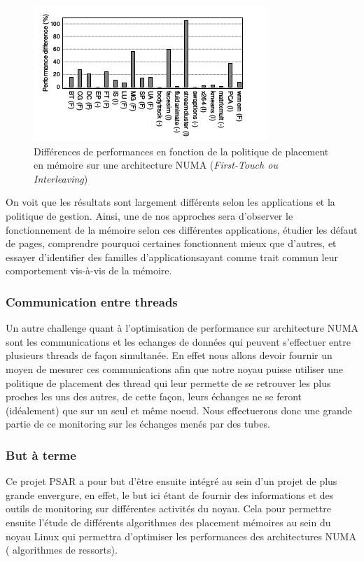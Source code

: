     \begin{figure}[H]
        \begin{center}
          \includegraphics[scale=0.65]{img/numa_memory_policy}
          \caption{Différences de performances en fonction de la politique de
            placement en mémoire sur une architecture NUMA (\textit{First-Touch ou Interleaving})}
        \end{center}
    \end{figure}

    On voit que les résultats sont largement différents selon les applications
    et la politique de gestion. Ainsi, une de nos approches sera d'observer le
    fonctionnement de la mémoire selon ces différentes applications, étudier les
    défaut de pages, comprendre pourquoi certaines fonctionnent mieux que
    d'autres, et essayer d'identifier des \og familles d'applications\fg ayant
    comme trait commun leur comportement vis-à-vis de la mémoire.
    
  \subsubsection{Communication entre threads}
    
    Un autre challenge quant à l'optimisation de performance sur architecture 
    NUMA sont les communications et les echanges de données qui peuvent s'effectuer entre 
    plusieurs threads de façon simultanée. En effet nous allons devoir fournir un moyen
    de mesurer ces communications afin que notre noyau 
    puisse utiliser une politique de placement des thread qui leur permette de 
    se retrouver les plus proches les uns des autres, de cette façon, leurs échanges 
    ne se feront (idéalement) que sur un seul et même noeud. Nous effectuerons donc
    une grande partie de ce monitoring sur les échanges menés par des tubes.

  \subsubsection{But à terme}

    Ce projet PSAR a pour but d'être ensuite intégré au sein d'un projet de plus grande 
    envergure, en effet, le but ici étant de fournir des informations et des outils
    de monitoring sur différentes activités du noyau. Cela pour permettre ensuite 
    l'étude de différents algorithmes des placement mémoires au sein du noyau Linux
    qui permettra d'optimiser les performances des architectures NUMA (
    algorithmes de \og ressorts\fg).
